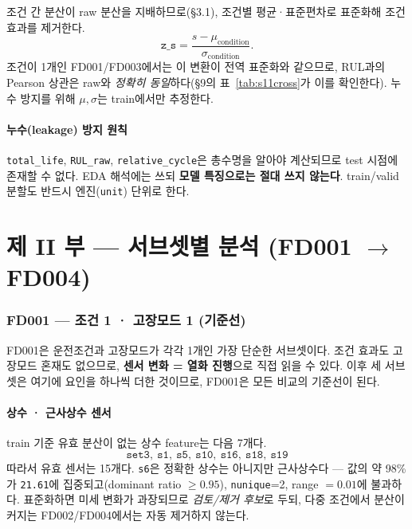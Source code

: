 \documentclass[11pt]{article}
\begin{document}
조건 간 분산이 raw 분산을 지배하므로(\S3.1), 조건별 평균·표준편차로 표준화해 조건 효과를 제거한다.
\[
  \texttt{z\_s} = \frac{s - \mu_{\text{condition}}}{\sigma_{\text{condition}}}.
\]
조건이 1개인 FD001/FD003에서는 이 변환이 전역 표준화와 같으므로, RUL과의 Pearson 상관은 raw와 \emph{정확히 동일}하다(\S9의 표~\ref{tab:s11cross}가 이를 확인한다).
누수 방지를 위해 $\mu,\sigma$는 train에서만 추정한다.

\subsection{누수(leakage) 방지 원칙}

\texttt{total\_life}, \texttt{RUL\_raw}, \texttt{relative\_cycle}은 총수명을 알아야 계산되므로 test 시점에 존재할 수 없다.
EDA 해석에는 쓰되 \textbf{모델 특징으로는 절대 쓰지 않는다}.
train/valid 분할도 반드시 엔진(\texttt{unit}) 단위로 한다.

\part*{제 II 부 — 서브셋별 분석 (FD001 $\to$ FD004)}

\section{FD001 — 조건 1 · 고장모드 1 (기준선)}

FD001은 운전조건과 고장모드가 각각 1개인 가장 단순한 서브셋이다.
조건 효과도 고장모드 혼재도 없으므로, \textbf{센서 변화 = 열화 진행}으로 직접 읽을 수 있다.
이후 세 서브셋은 여기에 요인을 하나씩 더한 것이므로, FD001은 모든 비교의 기준선이 된다.

\subsection{상수 · 근사상수 센서}

train 기준 유효 분산이 없는 상수 feature는 다음 7개다.
\[
  \texttt{set3},\ \texttt{s1},\ \texttt{s5},\ \texttt{s10},\ \texttt{s16},\ \texttt{s18},\ \texttt{s19}
\]
따라서 유효 센서는 15개다.
\texttt{s6}은 정확한 상수는 아니지만 근사상수다 — 값의 약 98\%가 \texttt{21.61}에 집중되고(dominant ratio $\ge0.95$), \texttt{nunique}=2, range $=0.01$에 불과하다.
표준화하면 미세 변화가 과장되므로 \emph{검토/제거 후보}로 두되, 다중 조건에서 분산이 커지는 FD002/FD004에서는 자동 제거하지 않는다.
\end{document}
